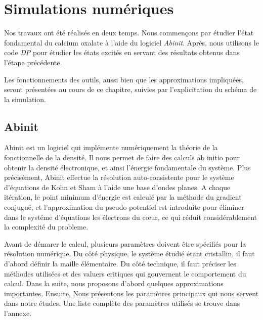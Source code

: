 \chapter{Simulations numériques}
\label{chapter-simulation}
Nos travaux ont été réalisés en deux temps.
Nous commençons par étudier l'état fondamental du calcium oxalate à l'aide du logiciel \textit{Abinit}.
Après, nous utilisons le code \textit{DP} pour étudier les états excités
en servant des résultats obtenus dans l'étape précédente.

Les fonctionnements des outils, aussi bien que les approximations impliquées,
seront présentées au cours de ce chapitre, suivies par l'explicitation du schéma de la simulation.

\section{Abinit}
\label{sec-abinit}
Abinit est un logiciel qui implémente numériquement la théorie de la fonctionnelle de la densité.
Il nous permet de faire des calculs ab initio pour obtenir la densité électronique,
et ainsi l'énergie fondamentale du système.
Plus précisément, Abinit effectue la résolution auto-consistente pour le système d'équations de Kohn et Sham à l'aide une base d'ondes planes.
A chaque itération, le point minimum d'énergie est calculé par la méthode du gradient conjugué,
et l'approximation du pseudo-potentiel est introduite pour éliminer dans le systéme d'équations les électrons du cœur,
ce qui réduit considérablement la complexité du probleme.

Avant de démarer le calcul,
plusieurs paramètres doivent être spécifiés pour la résolution numérique.
Du côté physique, le système étudié étant cristallin,
il faut d'abord définir la maille élémentaire.
Du côté technique, il faut préciser les méthodes utilisées et des valuers critiques qui gouvernent le comportement du calcul.
Dans la suite, nous proposons d'abord quelques approximations importantes. Ensuite,
Nous présentons les paramètres principaux qui nous servent dans notre études.
Une liste complète des paramètres utilisés se trouve dans l'annexe.

